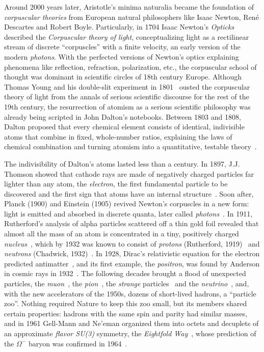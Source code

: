 Around 2000 years later, Aristotle's minima naturalia became the foundation of \emph{corpuscular theories} from European natural philosophers like Isaac Newton, Ren\'e Descartes and Robert Boyle. 
%
Particularly, in 1704 Isaac Newton's \emph{Opticks}~\cite{Newton:1704} described the \emph{Corpuscular theory of light}, conceptualizing light as a rectilinear stream of discrete ``corpuscles''  with a finite velocity, an early version of the modern \emph{photons}.
%
With the perfected versions of Newton's optics explaining phenomena like reflection, refraction, polarization, etc., the corpuscular school of thought was dominant in scientific circles of 18th century Europe.  
%
Although Thomas Young and his double-slit experiment in 1801~\cite{Young:1804} ousted the corpuscular theory of light from the annals of serious scientific discourse for the rest of the 19th century, the resurrection of atomism as a serious scientific philosophy was already being scripted in John Dalton's notebooks. 
%
Between 1803 and 1808, Dalton proposed that every chemical element consists of identical, indivisible atoms that combine in fixed, whole-number ratios, explaining the laws of chemical combination and turning atomism into a quantitative, testable theory~\cite{Dalton:1808}.

The indivisibility of Dalton's atoms lasted less than a century.
%
In 1897, J.J. Thomson showed that cathode rays are made of negatively charged particles far lighter than any atom, the \emph{electron}, the first fundamental particle to be discovered and the first sign that atoms have an internal structure~\cite{Thomson:1897}.
%
Soon after, Planck (1900) and Einstein (1905) revived Newton's corpuscles in a new form: light is emitted and absorbed in discrete quanta, later called \emph{photons}~\cite{Planck:1901,Einstein:1905}.
%
In 1911, Rutherford's analysis of alpha particles scattered off a thin gold foil revealed that almost all the mass of an atom is concentrated in a tiny, positively charged \emph{nucleus}~\cite{Rutherford:1911}, which by 1932 was known to consist of \emph{protons} (Rutherford, 1919)~\cite{Rutherford:1919} and \emph{neutrons} (Chadwick, 1932)~\cite{Chadwick:1932}.
%
In 1928, Dirac's relativistic equation for the electron predicted antimatter~\cite{Dirac:1928}, and its first example, the \emph{positron}, was found by Anderson in cosmic rays in 1932~\cite{Anderson:1933}.
%
The following decades brought a flood of unexpected particles, the \emph{muon}~\cite{Neddermeyer:1937}, the \emph{pion}~\cite{Lattes:1947}, the \emph{strange} particles~\cite{Rochester:1947} and the \emph{neutrino}~\cite{Cowan:1956}, and, with the new accelerators of the 1950s, dozens of short-lived hadrons, a ``particle zoo''.
%
Nothing required Nature to keep this zoo small, but its members shared certain properties: hadrons with the same spin and parity had similar masses, and in 1961 Gell-Mann and Ne'eman organized them into octets and decuplets of an approximate \emph{flavor SU(3)} symmetry, the \emph{Eightfold Way}~\cite{Gell-Mann:1961omu,Neeman:1961jhl}, whose prediction of the \(\Omega^-\) baryon was confirmed in 1964~\cite{Barnes:1964pd}.


